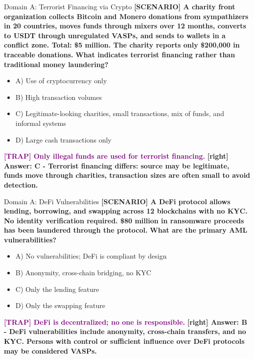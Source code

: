 \documentclass[11pt,a4paper]{beamer}
\newcommand{\trap}[1]{\textcolor{purple}{\textbf{[TRAP] #1}}}
\newcommand{\correct}[1]{\textcolor{green!50!black}{\textbf{[right] #1}}}
\newcommand{\scenario}[1]{\textcolor{blue!70!black}{\textbf{[SCENARIO] #1}}}
\begin{document}
\begin{frame}{Domain A: Terrorist Financing via Crypto}
\scenario{A charity front organization collects Bitcoin and Monero donations from sympathizers in 20 countries, moves funds through mixers over 12 months, converts to USDT through unregulated VASPs, and sends to wallets in a conflict zone. Total: \$5 million. The charity reports only \$200,000 in traceable donations.}
\vspace{0.2cm}
\textbf{What indicates terrorist financing rather than traditional money laundering?}
\vspace{0.2cm}
\begin{itemize}
    \item A) Use of cryptocurrency only
    \item B) High transaction volumes
    \item C) Legitimate-looking charities, small transactions, mix of funds, and informal systems
    \item D) Large cash transactions only
\end{itemize}
\vspace{0.2cm}
\trap{Only illegal funds are used for terrorist financing.}
\correct{Answer: C - Terrorist financing differs: source may be legitimate, funds move through charities, transaction sizes are often small to avoid detection.}
\end{frame}

\begin{frame}{Domain A: DeFi Vulnerabilities}
\scenario{A DeFi protocol allows lending, borrowing, and swapping across 12 blockchains with no KYC. No identity verification required. \$80 million in ransomware proceeds has been laundered through the protocol.}
\vspace{0.2cm}
\textbf{What are the primary AML vulnerabilities?}
\vspace{0.2cm}
\begin{itemize}
    \item A) No vulnerabilities; DeFi is compliant by design
    \item B) Anonymity, cross-chain bridging, no KYC
    \item C) Only the lending feature
    \item D) Only the swapping feature
\end{itemize}
\vspace{0.2cm}
\trap{DeFi is decentralized; no one is responsible.}
\correct{Answer: B - DeFi vulnerabilities include anonymity, cross-chain transfers, and no KYC. Persons with control or sufficient influence over DeFi protocols may be considered VASPs.}
\end{frame}
\end{document}
